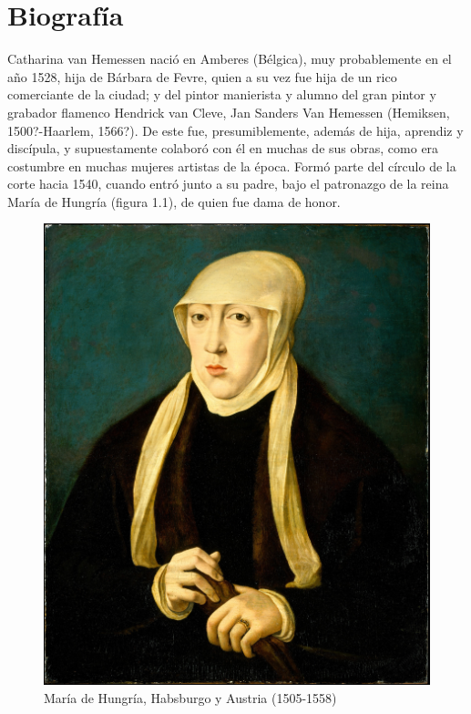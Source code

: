 \documentclass[12pt]{report}
\begin{document}
\chapter{Biografía}

Catharina van Hemessen nació en Amberes (Bélgica), muy probablemente en el año 1528, hija de Bárbara de Fevre, quien a su vez fue hija de un rico comerciante de la ciudad; y del pintor manierista y alumno del gran pintor y grabador flamenco Hendrick van Cleve, Jan Sanders Van Hemessen (Hemiksen, 1500?-Haarlem, 1566?). De este fue, presumiblemente, además de hija, aprendiz y discípula, y supuestamente colaboró con él en muchas de sus obras, como era costumbre en muchas mujeres artistas de la época. Formó parte del círculo de la corte hacia 1540, cuando entró junto a su padre, bajo el patronazgo de la reina María de Hungría (figura 1.1), de quien fue dama de honor.\bigskip

\begin{figure}
	\begin{center}
		\includegraphics[width=0.9\linewidth]{mary-queen-of-hungary}
		\caption{María de Hungría, Habsburgo y Austria (1505-1558)}
		\label{fig:wrapfig}
	\end{center}
\end{figure}
\end{document}
